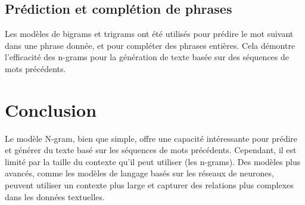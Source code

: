 \subsection{Prédiction et complétion de phrases}

Les modèles de bigrams et trigrams ont été utilisés pour prédire le mot suivant dans une phrase donnée, et pour compléter des phrases entières. Cela démontre l'efficacité des n-grams pour la génération de texte basée sur des séquences de mots précédents.



\section{Conclusion}

Le modèle N-gram, bien que simple, offre une capacité intéressante pour prédire et générer du texte basé sur les séquences de mots précédents. Cependant, il est limité par la taille du contexte qu'il peut utiliser (les n-grams). Des modèles plus avancés, comme les modèles de langage basés sur les réseaux de neurones, peuvent utiliser un contexte plus large et capturer des relations plus complexes dans les données textuelles.


